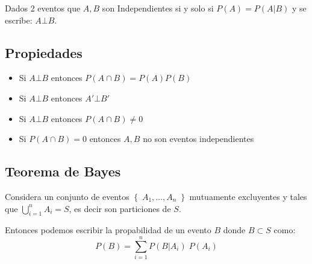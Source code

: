 \documentclass[12pt, fleqn]{report}                             %
\theoremstyle{break}                                            %
\newcommand{\Set}[1]            {\left\{ \; #1 \; \right\}}     %
\begin{document}
            Dados 2 eventos que $A, B$ son Independientes si y solo si
            $P(A) = P(A | B)$ y se escribe: $A \bot B$.


            \subsection{Propiedades}

                \begin{itemize}
                   
                    \item
                        Si $A \bot B$ entonces $P(A \cap B) = P(A) P(B)$
                        
                    \item
                        Si $A \bot B$ entonces $A' \bot B'$

                    \item
                        Si $A \bot B$ entonces $P(A \cap B) \neq 0$

                    \item
                        Si $P(A \cap B) = 0$ entonces $A, B$ no son eventos independientes

                \end{itemize}




            \subsection{Teorema de Bayes}

                Considera un conjunto de eventos $\Set{A_1, \dots, A_n}$ mutuamente excluyentes
                y tales que $\displaystyle \bigcup_{i=1}^n A_i = S$, es decir son particiones de $S$.

                Entonces podemos escribir la propabilidad de un evento $B$ donde $B \subset S$ como:
                \begin{equation*}
                    P(B) 
                        = \sum_{i = 1}^n P(B | A_i) \; P(A_i) 
                \end{equation*}
\end{document}
